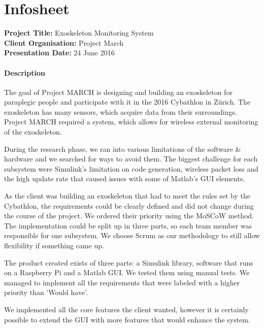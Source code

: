 \chapter{Infosheet}
\pagebreak
\begin{small}
{\bfseries Project Title:} Exoskeleton Monitoring System\\
{\bfseries Client Organisation:} Project March\\
{\bfseries Presentation Date:} 24 June 2016

\subsubsection{Description}
The goal of Project MARCH is designing and building an exoskeleton for paraplegic people and participate with it in the 2016 Cybathlon in Zürich. The exoskeleton has many sensors, which acquire data from their surroundings. Project MARCH required a system, which allows for wireless external monitoring of the exoskeleton. 

During the research phase, we ran into various limitations of the software \& hardware and we searched for ways to avoid them. The biggest challenge for each subsystem were Simulink's limitation on code generation, wireless packet loss and the high update rate that caused issues with some of Matlab's GUI elements.  

As the client was building an exoskeleton that had to meet the rules set by the Cybathlon, the requirements could be clearly defined and did not change during the course of the project. We ordered their priority using the MoSCoW method. The implementation could be split up in three parts, so each team member was responsible for one subsystem. We choose Scrum as our methodology to still allow flexibility if something came up.

The product created exists of three parts: a Simulink library, software that runs on a Raspberry Pi and a Matlab GUI. We tested them using manual tests. We managed to implement all the requirements that were labeled with a higher priority than 'Would have'. 

We implemented all the core features the client wanted, however it is certainly possible to extend the GUI with more features that would enhance the system.


\end{small}
